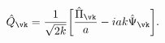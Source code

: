 \begin{equation}
\hat{Q}_{\vk} = \frac{1}{\sqrt{2 k}} \biggl[\frac{\hat{\Pi}_{\vk}}{a} -
i a k \hat{\Psi}_{\vk} \biggr].
\label{Q1}
\end{equation}

